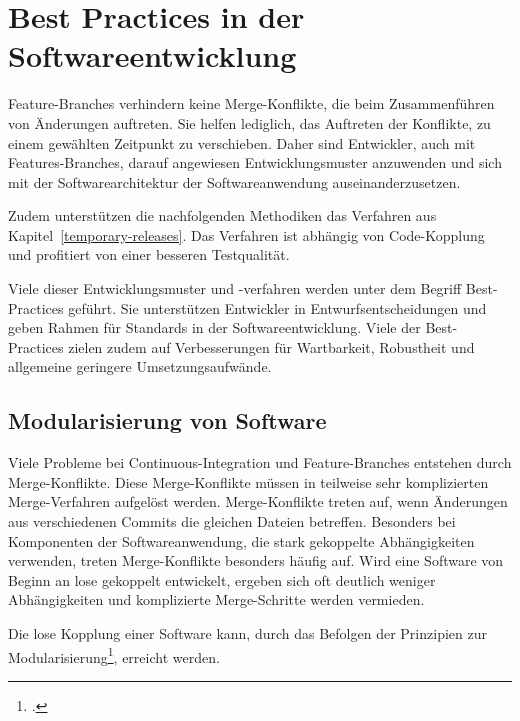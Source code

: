 \section{Best Practices in der Softwareentwicklung}

Feature-Branches verhindern keine Merge-Konflikte, die beim Zusammenführen von Änderungen auftreten. Sie helfen lediglich, das Auftreten der Konflikte, zu einem gewählten Zeitpunkt zu verschieben. Daher sind Entwickler, auch mit Features-Branches, darauf angewiesen Entwicklungsmuster anzuwenden und sich mit der Softwarearchitektur der Softwareanwendung auseinanderzusetzen.

Zudem unterstützen die nachfolgenden Methodiken das Verfahren \glqq {}\grqq{} aus Kapitel~\ref{temporary-releases}. Das Verfahren ist abhängig von Code-Kopplung und profitiert von einer besseren Testqualität.

Viele dieser Entwicklungsmuster und -verfahren werden unter dem Begriff \glqq Best-Practices\grqq{} geführt. Sie unterstützen Entwickler in Entwurfsentscheidungen und geben Rahmen für Standards in der Softwareentwicklung. Viele der Best-Practices zielen zudem auf Verbesserungen für Wartbarkeit, Robustheit und allgemeine geringere Umsetzungsaufwände.

\subsection{Modularisierung von Software}

Viele Probleme bei Continuous-Integration und Feature-Branches entstehen durch Merge-Konflikte. Diese Merge-Konflikte müssen in teilweise sehr komplizierten Merge-Verfahren aufgelöst werden. Merge-Konflikte treten auf, wenn Änderungen aus verschiedenen Commits die gleichen Dateien betreffen. Besonders bei Komponenten der Softwareanwendung, die stark gekoppelte Abhängigkeiten verwenden, treten Merge-Konflikte besonders häufig auf. Wird eine Software von Beginn an lose gekoppelt entwickelt, ergeben sich oft deutlich weniger Abhängigkeiten und komplizierte Merge-Schritte werden vermieden.

Die lose Kopplung einer Software kann, durch das Befolgen der Prinzipien zur Modularisierung\footcite{2012-barth-modularisation}, erreicht werden. 

